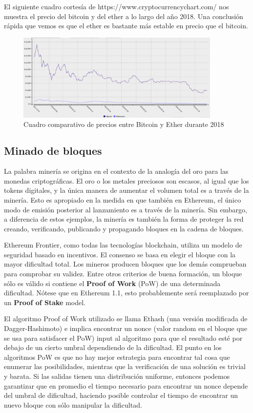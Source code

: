El siguiente cuadro cortesía de https://www.cryptocurrencychart.com/ nos muestra el precio del 
bitcoin y del ether a lo largo del año 2018. Una conclusión rápida que vemos es que el ether es
bastante más estable en precio que el bitcoin.

\begin{figure}[htbp!] 
\centering    
\includegraphics[width=0.9\textwidth]{ethbtc2018}
\caption[EthBtc2018]{Cuadro comparativo de precios entre Bitcoin y Ether durante 2018}
\label{fig:eth-btc-2018}
\end{figure}


\subsection{Minado de bloques}

La palabra minería se origina en el contexto de la analogía del oro para las monedas criptográficas. El oro o los metales preciosos son escasos, al igual que los tokens digitales, y la única manera de aumentar el volumen total es a través de la minería. Esto es apropiado en la medida en que también en Ethereum, el único modo de emisión posterior al lanzamiento es a través de la minería. Sin embargo, a diferencia de estos ejemplos, la minería es también la forma de proteger la red creando, verificando, publicando y propagando bloques en la cadena de bloques.

Ethereum Frontier, como todas las tecnologías blockchain, utiliza un modelo de seguridad basado en incentivos. El consenso se basa en elegir el bloque con la mayor dificultad total. Los mineros producen bloques que los demás comprueban para comprobar su validez. Entre otros criterios de buena formación, un bloque sólo es válido si contiene el \textbf{Proof of Work} (PoW) de una determinada dificultad. Nótese que en Ethereum 1.1, esto probablemente será reemplazado por un
\textbf{Proof of Stake} model.

El algoritmo Proof of Work utilizado se llama Ethash (una versión modificada de Dagger-Hashimoto) e implica encontrar un nonce (valor random en el bloque que se usa para satisfacer el PoW) input al algoritmo para que el resultado esté por debajo de un cierto umbral dependiendo de la dificultad. El punto en los algoritmos PoW es que no hay mejor estrategia para encontrar tal cosa que enumerar las posibilidades, mientras que la verificación de una solución es trivial y barata. Si las salidas tienen una distribución uniforme, entonces podemos garantizar que en promedio el tiempo necesario para encontrar un nonce depende del umbral de dificultad, haciendo posible controlar el tiempo de encontrar un nuevo bloque con sólo manipular la dificultad.

